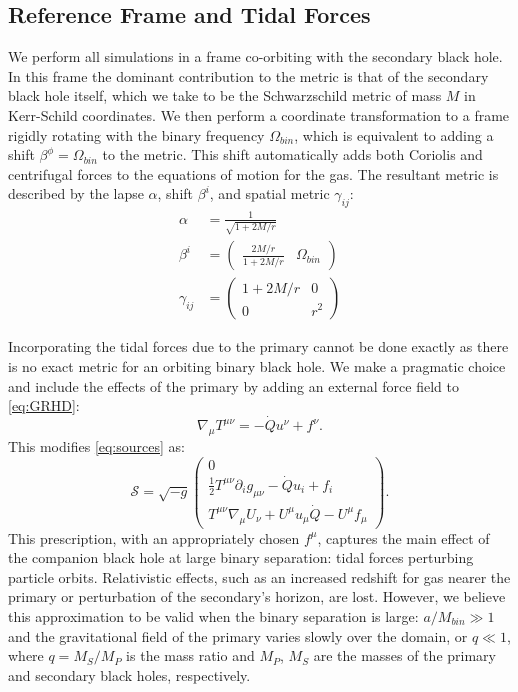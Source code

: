 \documentclass{emulateapj}
\newcommand{\al}{\alpha}
\newcommand{\be}{\beta}
\newcommand{\gam}{\gamma}
\newcommand{\Om}{\Omega}
\newcommand{\pd}{\partial}
\begin{document}
\subsection{Reference Frame and Tidal Forces}
\label{subsec:frameforces}

We perform all simulations in a frame co-orbiting with the secondary black hole.  In this frame the dominant contribution to the metric is that of the secondary black hole itself, which we take to be the Schwarzschild metric of mass $M$ in Kerr-Schild coordinates.  We then perform a coordinate transformation to a frame rigidly rotating with the binary frequency $\Om_{bin}$, which is equivalent to adding a shift $\be^\phi = \Om_{bin}$ to the metric.  This shift automatically adds both Coriolis and centrifugal forces to the equations of motion for the gas.  The resultant metric is described by the lapse $\al$, shift $\be^i$, and spatial metric $\gam_{ij}$:
\begin{align}
	\al &= \frac{1}{\sqrt{1+2M/r}} \\
	\be^i &= \begin{pmatrix} \frac{2M/r}{1+2M/r} & \Om_{bin} \end{pmatrix} \\
	\gam_{ij} &= \begin{pmatrix} 1+2M/r & 0 \\ 0 & r^2 \end{pmatrix}
\end{align}

Incorporating the tidal forces due to the primary cannot be done exactly as there is no exact metric for an orbiting binary black hole.  We make a pragmatic choice and include the effects of the primary by adding an external force field to \eqref{eq:GRHD}:
\begin{equation}
	\nabla_\mu T^{\mu\nu} = -\dot{Q} u^\nu + f^\nu . 
\end{equation}
This modifies \eqref{eq:sources} as:
\begin{equation}
	\mathcal{S} = \sqrt{-g} \begin{pmatrix} 0 \\
                        \frac{1}{2}T^{\mu\nu}\pd_i g_{\mu\nu} - \dot{Q}u_i  + f_i \\
                        T^{\mu\nu}\nabla_\mu U_\nu + U^\mu u_\mu \dot{Q} - U^\mu f_\mu \end{pmatrix} .\label{eq:sourcesF}
\end{equation}
This prescription, with an appropriately chosen $f^\mu$, captures the main effect of the companion black hole at large binary separation: tidal forces perturbing particle orbits.  Relativistic effects, such as an increased redshift for gas nearer the primary or perturbation of the secondary's horizon, are lost. However, we believe this approximation to be valid when the binary separation is large: $a/M_{bin} \gg 1$ and the gravitational field of the primary varies slowly over the domain, or $q \ll 1$, where $q = M_S / M_P$ is the mass ratio and $M_P$, $M_S$ are the masses of the primary and secondary black holes, respectively.
\end{document}
